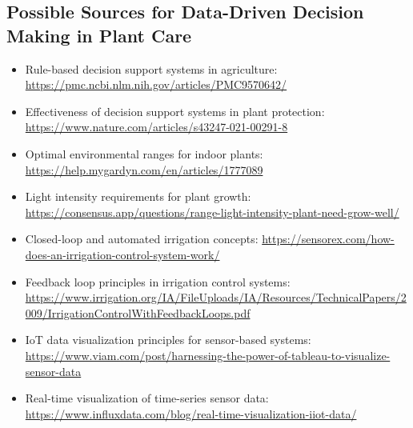 \subsection*{Possible Sources for Data-Driven Decision Making in Plant Care}

\begin{itemize}
    \item Rule-based decision support systems in agriculture:  
    \url{https://pmc.ncbi.nlm.nih.gov/articles/PMC9570642/}

    \item Effectiveness of decision support systems in plant protection:  
    \url{https://www.nature.com/articles/s43247-021-00291-8}

    \item Optimal environmental ranges for indoor plants:  
    \url{https://help.mygardyn.com/en/articles/1777089}

    \item Light intensity requirements for plant growth:  
    \url{https://consensus.app/questions/range-light-intensity-plant-need-grow-well/}

    \item Closed-loop and automated irrigation concepts:  
    \url{https://sensorex.com/how-does-an-irrigation-control-system-work/}

    \item Feedback loop principles in irrigation control systems:  
    \url{https://www.irrigation.org/IA/FileUploads/IA/Resources/TechnicalPapers/2009/IrrigationControlWithFeedbackLoops.pdf}

    \item IoT data visualization principles for sensor-based systems:  
    \url{https://www.viam.com/post/harnessing-the-power-of-tableau-to-visualize-sensor-data}

    \item Real-time visualization of time-series sensor data:  
    \url{https://www.influxdata.com/blog/real-time-visualization-iiot-data/}
\end{itemize}
